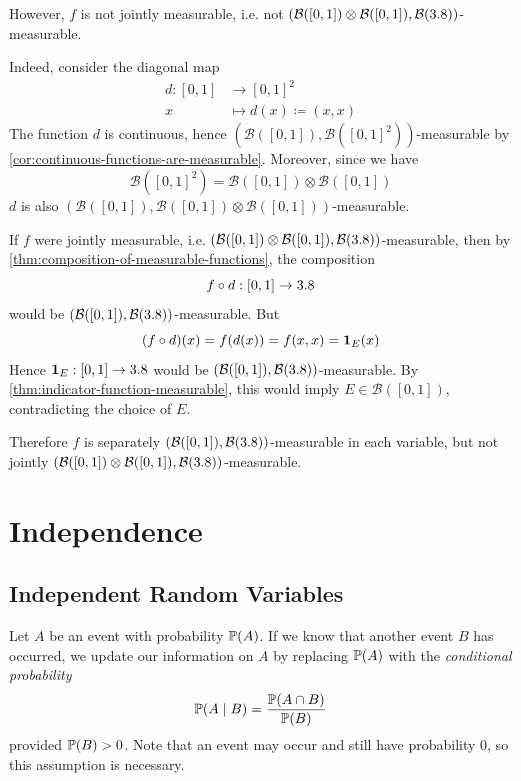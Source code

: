 \begin{example}
However, $f$ is not jointly measurable, i.e. not
\(
(\mathcal{B}([0,1]) \otimes \mathcal{B}([0,1]),\mathcal{B}(3.8))
\)-measurable.

Indeed, consider the diagonal map
\[
\begin{aligned}
d : [0,1] &\longrightarrow [0,1]^2 \\
x &\longmapsto
d(x)
\coloneq
(x,x)
\end{aligned}
\]
The function $d$ is continuous, hence $(\mathcal{B}([0,1]),\mathcal{B}([0,1]^2))$-measurable by \autoref{cor:continuous-functions-are-measurable}.
Moreover, 
since we have
\[
\mathcal{B}([0,1]^2)
=
\mathcal{B}([0,1]) \otimes \mathcal{B}([0,1])
\]
 $d$ is also $(\mathcal{B}([0,1]),\mathcal{B}([0,1]) \otimes \mathcal{B}([0,1]))$-measurable.

If $f$ were jointly measurable, i.e. $(\mathcal{B}([0,1]) \otimes \mathcal{B}([0,1]),\mathcal{B}(3.8))$-measurable, then by \autoref{thm:composition-of-measurable-functions}, the composition
\[
f \circ d : [0,1] \to 3.8
\]
would be $(\mathcal{B}([0,1]),\mathcal{B}(3.8))$-measurable.
But
\[
(f\circ d)(x)
=
f(d(x))
=
f(x,x)
=
\mathbf{1}_E(x)
\]
Hence $\mathbf{1}_E : [0,1] \to 3.8$ would be $(\mathcal{B}([0,1]),\mathcal{B}(3.8))$-measurable.
By \autoref{thm:indicator-function-measurable}, this would imply $E\in\mathcal{B}([0,1])$, contradicting the choice of $E$.

Therefore $f$ is separately $(\mathcal{B}([0,1]),\mathcal{B}(3.8))$-measurable in each variable, but not jointly $(\mathcal{B}([0,1]) \allowbreak \otimes \allowbreak \mathcal{B}([0,1]), \allowbreak \mathcal{B}(3.8))$-measurable.
\end{example}
\clearpage

\section{Independence}


\subsection{Independent Random Variables}

Let $A$ be an event with probability $\mathbb{P}(A)$.
If we know that another event $B$ has occurred, we update our information on $A$ by replacing $\mathbb{P}(A)$ with the \emph{conditional probability} 
\[
\mathbb{P}(A \mid B) = \frac{\mathbb{P}(A \cap B)}{\mathbb{P}(B)}
\]
provided $\mathbb{P}(B) > 0$.
Note that an event may occur and still have probability $0$, so this assumption is necessary.

